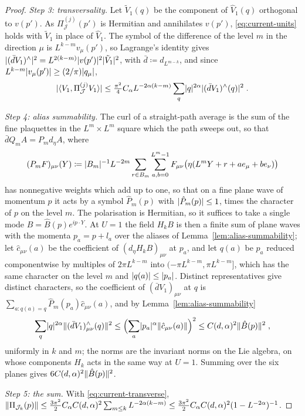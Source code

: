 \documentclass[11pt]{preprint}
\DeclarePairedDelimiter{\abs}{\lvert}{\rvert}
\DeclarePairedDelimiter{\norm}{\lVert}{\rVert}
\numberwithin{equation}{section}
\theoremstyle{definition}
\theoremstyle{remark}
\theoremstyle{plain}
\begin{document}
\begin{proof}
\emph{Step 3: transversality.} Let $\tilde V_1(q)$ be the component of $\hat V_1(q)$ orthogonal to $v(p')$. As $\Pi^{(j)}_{\mathcal J}(p')$ is Hermitian and annihilates $v(p')$, \eqref{eq:current-units} holds with $\tilde V_1$ in place of $\hat V_1$. The symbol of the difference of the level $m$ in the direction $\mu$ is $L^{k-m}v_\mu(p')$, so Lagrange's identity gives $\abs{(\bar dV_1)^\wedge}^2 = L^{2(k-m)}\abs{v(p')}^2\abs{\tilde V_1}^2$, with $\bar d \coloneqq d_{L^{m-k}}$, and since $L^{k-m}\abs{v_\mu(p')} \geq (2/\pi)\abs{q_\mu}$,
\begin{equation}\label{eq:current-transverse}
    \abs{\langle V_1, \Pi^{(j)}_{\mathcal J}V_1 \rangle} \leq \tfrac{\pi^2}{4}C_\alpha L^{-2\alpha(k-m)}\sum_q\abs{q}^{2\alpha}\abs{(\bar dV_1)^\wedge(q)}^2\;.
\end{equation}

\emph{Step 4: alias summability.} The curl of a straight-path average is the sum of the fine plaquettes in the $L^m \times L^m$ square which the path sweeps out, so that $\bar dQ_mA = P_md_\eta A$, where
\begin{equation}\label{eq:plaquette-average}
    (P_mF)_{\mu\nu}(Y) \coloneqq \abs{B_m}^{-1}L^{-2m}\sum_{r \in B_m}\sum_{a,b=0}^{L^m-1}F_{\mu\nu}\bigl(\eta(L^mY + r + ae_\mu + be_\nu)\bigr)
\end{equation}
has nonnegative weights which add up to one, so that on a fine plane wave of momentum $p$ it acts by a symbol $\hat P_m(p)$ with $\abs{\hat P_m(p)} \leq 1$, times the character of $p$ on the level $m$. The polarisation is Hermitian, so it suffices to take a single mode $B = \hat B(p)e^{ip\cdot Y}$. At $U = 1$ the field $H_kB$ is then a finite sum of plane waves with the momenta $p_a = p + l_a$ over the aliases of Lemma~\ref{lem:alias-summability}; let $\hat c_{\mu\nu}(a)$ be the coefficient of $(d_\eta H_kB)_{\mu\nu}$ at $p_a$, and let $q(a)$ be $p_a$ reduced componentwise by multiples of $2\pi L^{k-m}$ into $(-\pi L^{k-m}, \pi L^{k-m}]$, which has the same character on the level $m$ and $\abs{q(a)} \leq \abs{p_a}$. Distinct representatives give distinct characters, so the coefficient of $(\bar dV_1)_{\mu\nu}$ at $q$ is $\sum_{a : q(a) = q}\hat P_m(p_a)\hat c_{\mu\nu}(a)$, and by Lemma~\ref{lem:alias-summability}
\begin{equation}\label{eq:folding}
    \sum_q\abs{q}^{2\alpha}\norm{(\bar dV_1)^\wedge_{\mu\nu}(q)}^2 \leq \Bigl(\sum_a\abs{p_a}^\alpha\norm{\hat c_{\mu\nu}(a)}\Bigr)^2 \leq C(d, \alpha)^2\norm{\hat B(p)}^2\;,
\end{equation}
uniformly in $k$ and $m$; the norms are the invariant norms on the Lie algebra, on whose components $H_k$ acts in the same way at $U = 1$. Summing over the six planes gives $6C(d, \alpha)^2\norm{\hat B(p)}^2$.

\emph{Step 5: the sum.} With \eqref{eq:current-transverse}, $\norm{\Pi_{\mathcal J_k}(p)} \leq \frac{3\pi^2}{2}C_\alpha C(d, \alpha)^2\sum_{m \leq k}L^{-2\alpha(k-m)} \leq \frac{3\pi^2}{2}C_\alpha C(d, \alpha)^2(1 - L^{-2\alpha})^{-1}$.
\end{proof}
\end{document}
